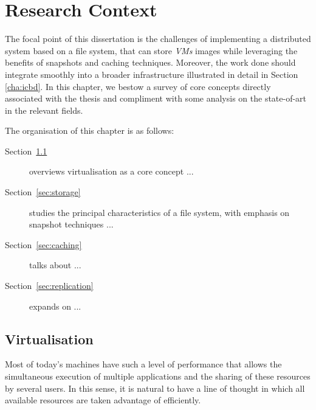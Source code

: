 
\chapter{Research Context}
\label{cha:research_context}

The focal point of this dissertation is the challenges of implementing a distributed system based on a file system, that can store \textit{VMs} images while leveraging the benefits of snapshots and caching techniques. Moreover, the work done should integrate smoothly into a broader infrastructure illustrated in detail in Section \ref{cha:icbd}.
In this chapter, we bestow a survey of core concepts directly associated with the thesis and compliment with some analysis on the state-of-art in the relevant fields.

The organisation of this chapter is as follows:\\

\begin{description}
	\item [Section~\ref{sec:virtualisation}] overviews virtualisation as a core concept ...
	\item [Section~\ref{sec:storage}] studies the principal characteristics of a file system, with emphasis on snapshot techniques ...
	\item [Section~\ref{sec:caching}] talks about ...
	\item [Section~\ref{sec:replication}] expands on ...
\end{description}

\section{Virtualisation}
\label{sec:virtualisation}

Most of today's machines have such a level of performance that allows the simultaneous execution of multiple applications and the sharing of these resources by several users. In this sense, it is natural to have a line of thought in which all available resources are taken advantage of efficiently.

